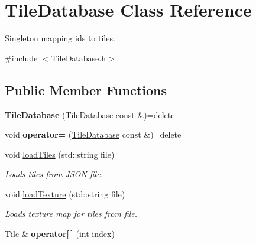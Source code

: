 \hypertarget{classTileDatabase}{\section{Tile\-Database Class Reference}
\label{classTileDatabase}
}


Singleton mapping ids to tiles.  




{\ttfamily \#include $<$Tile\-Database.\-h$>$}

\subsection*{Public Member Functions}
\begin{DoxyCompactItemize}
\item 
\hypertarget{classTileDatabase_a416e304c465d358759c5f75c2d9dd339}{{\bfseries Tile\-Database} (\hyperlink{classTileDatabase}{Tile\-Database} const \&)=delete}\label{classTileDatabase_a416e304c465d358759c5f75c2d9dd339}

\item 
\hypertarget{classTileDatabase_a6fea9bd536a262734b09a39e5b737250}{void {\bfseries operator=} (\hyperlink{classTileDatabase}{Tile\-Database} const \&)=delete}\label{classTileDatabase_a6fea9bd536a262734b09a39e5b737250}

\item 
void \hyperlink{classTileDatabase_a986e55f0705dbfb5428931563eff1497}{load\-Tiles} (std\-::string file)
\begin{DoxyCompactList}\small\item\em Loads tiles from J\-S\-O\-N file. \end{DoxyCompactList}\item 
\hypertarget{classTileDatabase_a1eb9f7c3ff7e497bada7a1475fb271f4}{void \hyperlink{classTileDatabase_a1eb9f7c3ff7e497bada7a1475fb271f4}{load\-Texture} (std\-::string file)}\label{classTileDatabase_a1eb9f7c3ff7e497bada7a1475fb271f4}

\begin{DoxyCompactList}\small\item\em Loads texture map for tiles from file. \end{DoxyCompactList}\item 
\hypertarget{classTileDatabase_afd8392440590a9a162104d27f93001a8}{\hyperlink{classTile}{Tile} \& {\bfseries operator\mbox{[}$\,$\mbox{]}} (int index)}\label{classTileDatabase_afd8392440590a9a162104d27f93001a8}


\end{DoxyCompactItemize}
